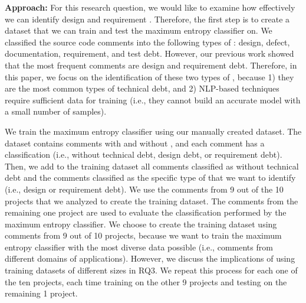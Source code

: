 \vspace{1mm}
\noindent \textbf{Approach:} For this research question, we would like to examine how effectively we can identify design and requirement \SATD. Therefore, the first step is to create a dataset that we can train and test the maximum entropy classifier on. We classified the source code comments into the following types of \SATD: design, defect, documentation, requirement, and test debt. However, our previous work showed that the most frequent \SATD comments are design and requirement debt. Therefore, in this paper, we focus on the identification of these two types of \SATD, because 1) they are the most common types of technical debt, and 2) NLP-based techniques require sufficient data for training (i.e., they cannot build an accurate model with a small number of samples).

We train the maximum entropy classifier using our manually created dataset. The dataset contains comments with and without \SATD, and each comment has a classification (i.e., without technical debt, design debt, or requirement debt). Then, we add to the training dataset all comments classified as without technical debt and the comments classified as the specific type of \SATD that we want to identify (i.e., design or requirement debt). We use the comments from 9 out of the 10 projects that we analyzed to create the training dataset. The comments from the remaining one project are used to evaluate the classification performed by the maximum entropy classifier. We choose to create the training dataset using comments from 9 out of 10 projects, because we want to train the maximum entropy classifier with the most diverse data possible (i.e., comments from different domains of applications). However, we discuss the implications of using training datasets of different sizes in RQ3. We repeat this process for each one of the ten projects, each time training on the other 9 projects and testing on the remaining 1 project.

